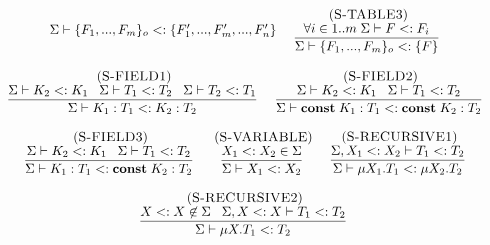 \begin{figure}[!ht]
\begin{footnotesize}
$$\begin{array}{c}
\begin{array}{c}
      {\senv \vdash \{F_{1}, ..., F_{m}\}_{o} \subtype \{F_{1}', ..., F_{m}', ..., F_{n}'\}}
\end{array}
\;
\begin{array}{c}
\mylabel{S-TABLE3}\\
\dfrac{\forall i \in 1..m \; \senv \vdash F \subtype F_{i}}
      {\senv \vdash \{F_{1}, ..., F_{m}\}_{o} \subtype \{F\}} 
\end{array}
\\ \\
\begin{array}{c}
\mylabel{S-FIELD1}\\
\dfrac{\senv \vdash K_{2} \subtype K_{1} \;\;\;
       \senv \vdash T_{1} \subtype T_{2} \;\;\;
       \senv \vdash T_{2} \subtype T_{1}}
      {\senv \vdash K_{1}:T_{1} \subtype K_{2}:T_{2}}
\end{array}
\;
\begin{array}{c}
\mylabel{S-FIELD2}\\
\dfrac{\senv \vdash K_{2} \subtype K_{1} \;\;\;
       \senv \vdash T_{1} \subtype T_{2}}
      {\senv \vdash \Const \; K_{1}:T_{1} \subtype \Const \; K_{2}:T_{2}}
\end{array}
\\ \\
\begin{array}{c}
\mylabel{S-FIELD3}\\
\dfrac{\senv \vdash K_{2} \subtype K_{1} \;\;\;
       \senv \vdash T_{1} \subtype T_{2}}
      {\senv \vdash K_{1}:T_{1} \subtype \Const \; K_{2}:T_{2}}
\end{array}
\;
\begin{array}{c}
\mylabel{S-VARIABLE}\\
\dfrac{X_{1} \subtype X_{2} \in \senv}
      {\senv \vdash X_{1} \subtype X_{2}}
\end{array}
\;
\begin{array}{c}
\mylabel{S-RECURSIVE1}\\
\dfrac{\senv, X_{1} \subtype X_{2} \vdash T_{1} \subtype T_{2}}
      {\senv \vdash \mu X_{1}.T_{1} \subtype \mu X_{2}.T_{2}}
\end{array}
\\ \\
\begin{array}{c}
\mylabel{S-RECURSIVE2}\\
\dfrac{X \subtype X \not\in \senv \;\;\;
      \senv, X \subtype X \vdash T_{1} \subtype T_{2}}
      {\senv \vdash \mu X.T_{1} \subtype T_{2}}
\end{array}
\;

\end{array}$$
\end{footnotesize}
\end{figure}
